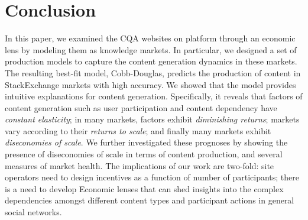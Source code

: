 \section{Conclusion}

In this paper, we examined the CQA websites on  platform through an economic lens by modeling them as knowledge markets. In particular, we designed a set of production models to capture the content generation dynamics in these markets. The resulting best-fit model, Cobb-Douglas, predicts the production of content in StackExchange markets with high accuracy. We showed that the model provides intuitive explanations for content generation. Specifically, it reveals that factors of content generation such as user participation and content dependency have \emph{constant elasticity}; in many markets, factors exhibit \emph{diminishing returns}; markets vary according to their \emph{returns to scale}; and finally many markets exhibit \emph{diseconomies of scale}. We further investigated these prognoses by showing the presence of diseconomies of scale in terms of content production, and several measures of market health. The implications of our work are two-fold: site operators need to design incentives as a function of number of participants; there is a need to develop Economic lenses that can shed insights into the complex dependencies amongst different content types and participant actions in general social networks.  
